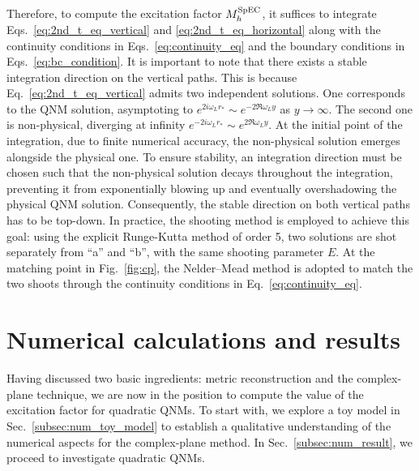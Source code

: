 \documentclass[aps,prd,amsmath,floats,floatfix, twocolumn,
superscriptaddress,nofootinbib,showpacs]{revtex4-1}
\begin{document}
Therefore, to compute the excitation factor $M_{h}^{\rm SpEC}$, it suffices to integrate Eqs.~\eqref{eq:2nd_t_eq_vertical} and \eqref{eq:2nd_t_eq_horizontal} along with the continuity conditions in Eqs.~\eqref{eq:continuity_eq} and the boundary conditions in Eqs.~\eqref{eq:bc_condition}. It is important to note that there exists a stable integration direction on the vertical paths. This is because Eq.~\eqref{eq:2nd_t_eq_vertical} admits two independent solutions. One corresponds to the QNM solution, asymptoting to $e^{2i\omega_L r_*}\sim e^{-2\Re \omega_L y}$ as $y\to \infty$. The second one is non-physical, diverging at infinity $ e^{-2i\omega_L r_*}\sim e^{2\Re \omega_L y}$. At the initial point of the integration, due to finite numerical accuracy, the non-physical solution emerges alongside the physical one. To ensure stability, an integration direction must be chosen such that the non-physical solution decays throughout the integration, preventing it from exponentially blowing up and eventually overshadowing the physical QNM solution. Consequently, the stable direction on both vertical paths has to be top-down. In practice,  the shooting method is employed to achieve this goal: using the explicit Runge-Kutta method of order 5, two solutions are shot separately from ``a'' and ``b'', with the same shooting parameter $E$. At the matching point in Fig.~\ref{fig:cp}, the Nelder–Mead method is adopted to match the two shoots through the continuity conditions in Eq.~\eqref{eq:continuity_eq}.

\section{Numerical calculations and results}
\label{sec:results}
Having discussed two basic ingredients: metric reconstruction and the complex-plane technique, we are now in the position to compute the value of the excitation factor for quadratic QNMs. To start with, we explore a toy model in Sec.~\ref{subsec:num_toy_model} to establish a qualitative understanding of the numerical aspects for the complex-plane method. In Sec.~\ref{subsec:num_result}, we proceed to investigate quadratic QNMs.
\end{document}
